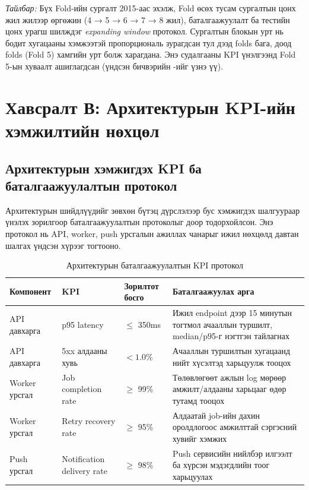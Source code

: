 \noindent\textit{Тайлбар:} Бүх Fold-ийн сургалт 2015-аас эхэлж, Fold өсөх тусам сургалтын цонх жил жилээр өргөжин (4 → 5 → 6 → 7 → 8 жил), баталгаажуулалт ба тестийн цонх урагш шилждэг \emph{expanding window} протокол. Сургалтын блокын урт нь бодит хугацааны хэмжээтэй пропорциональ зурагдсан тул дээд folds бага, доод folds (Fold 5) хамгийн урт болж харагдана. Энэ судалгааны KPI үнэлгээнд Fold 5-ын хуваалт ашиглагдсан (үндсэн бичвэрийн -ийг үзнэ үү).

\section*{Хавсралт В: Архитектурын KPI-ийн хэмжилтийн нөхцөл}
\label{app:kpi_measurement}
\renewcommand{\thetable}{В.\arabic{table}}
\renewcommand{\thefigure}{В.\arabic{figure}}
\setcounter{table}{0}
\setcounter{figure}{0}

\subsection*{Архитектурын хэмжигдэх KPI ба баталгаажуулалтын протокол}

Архитектурын шийдлүүдийг зөвхөн бүтэц дүрслэлээр бус хэмжигдэх шалгуураар үнэлэх зорилгоор баталгаажуулалтын протоколыг доор тодорхойлсон. Энэ протокол нь API, worker, push урсгалын ажиллах чанарыг ижил нөхцөлд давтан шалгах үндсэн хүрээг тогтооно.

\begin{table}[H]
\centering
\caption{Архитектурын баталгаажуулалтын KPI протокол}
\label{tab:kpi_protocol_detail}
\renewcommand{\arraystretch}{1.10}
\setlength{\tabcolsep}{3pt}
\footnotesize
\begin{tabularx}{\textwidth}{|>{\raggedright\arraybackslash}p{2.7cm}|>{\raggedright\arraybackslash}p{2.6cm}|>{\raggedright\arraybackslash}p{2.0cm}|>{\raggedright\arraybackslash}X|}
\hline
\textbf{Компонент} & \textbf{KPI} & \textbf{Зорилтот босго} & \textbf{Баталгаажуулах арга} \\ \hline
API давхарга & p95 latency & $\leq$ 350ms & Ижил endpoint дээр 15 минутын тогтмол ачааллын туршилт, median/p95-г нэгтгэн тайлагнах \\ \hline
API давхарга & 5xx алдааны хувь & $<1.0\%$ & Ачааллын туршилтын хугацаанд нийт хүсэлтэд харьцуулж тооцох \\ \hline
Worker урсгал & Job completion rate & $\geq$ 99\% & Төлөвлөгөөт ажлын log мөрөөр амжилт/алдааны харьцааг өдөр тутамд тооцох \\ \hline
Worker урсгал & Retry recovery rate & $\geq$ 95\% & Алдаатай job-ийн дахин оролдлогоос амжилттай сэргэсний хувийг хэмжих \\ \hline
Push урсгал & Notification delivery rate & $\geq$ 98\% & Push сервисийн нийлбэр илгээлт ба хүрсэн мэдэгдлийн тоог харьцуулах \\ \hline
\end{tabularx}
\end{table}

